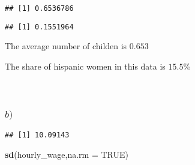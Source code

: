 \documentclass[
]{article}
\newenvironment{Shaded}{\begin{snugshade}}{\end{snugshade}}
\newcommand{\DataTypeTok}[1]{\textcolor[rgb]{0.13,0.29,0.53}{#1}}
\newcommand{\DecValTok}[1]{\textcolor[rgb]{0.00,0.00,0.81}{#1}}
\newcommand{\KeywordTok}[1]{\textcolor[rgb]{0.13,0.29,0.53}{\textbf{#1}}}
\newcommand{\NormalTok}[1]{#1}
\newcommand{\OperatorTok}[1]{\textcolor[rgb]{0.81,0.36,0.00}{\textbf{#1}}}
\newcommand{\OtherTok}[1]{\textcolor[rgb]{0.56,0.35,0.01}{#1}}
\newcommand{\StringTok}[1]{\textcolor[rgb]{0.31,0.60,0.02}{#1}}
\begin{document}
\begin{Shaded}
\end{Shaded}

\begin{verbatim}
## [1] 0.6536786
\end{verbatim}

\begin{Shaded}
\end{Shaded}

\begin{verbatim}
## [1] 0.1551964
\end{verbatim}

The average number of childen is \(0.653\)

The share of hispanic women in this data is \(15.5\)\%\\
~\\
~\\

\hypertarget{b}{%
\subsubsection{\texorpdfstring{\(b)\)}{b)}}\label{b}}

\begin{Shaded}
\end{Shaded}

\begin{verbatim}
## [1] 10.09143
\end{verbatim}

\begin{Shaded}
\begin{Highlighting}[]
\KeywordTok{sd}\NormalTok{(hourly\_wage,}\DataTypeTok{na.rm =} \OtherTok{TRUE}\NormalTok{)}
\end{Highlighting}
\end{Shaded}
\end{document}
